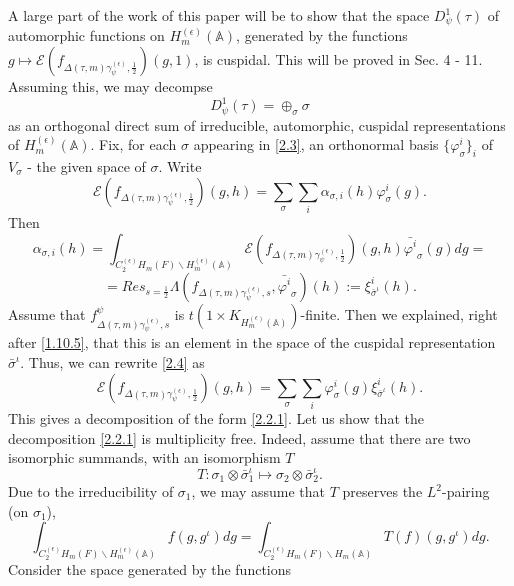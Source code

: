 \documentclass[12pts]{amsart}
\newcommand{\BA}{{\mathbb {A}}}
\begin{document}
A large part of the work of this paper will be to show that the space $D^1_\psi(\tau)$ of automorphic functions on $H^{(\epsilon)}_m(\BA)$, generated by the functions $g\mapsto \mathcal{E}(f_{\Delta(\tau,m)\gamma^{(\epsilon)}_\psi,\frac{1}{2}})(g,1)$, is cuspidal.  This will be proved in Sec. 4 - 11. Assuming this, we may decompse
\begin{equation}\label{2.3}
D^1_\psi(\tau)=\oplus _\sigma\sigma
\end{equation}
as an orthogonal direct sum of irreducible, automorphic, cuspidal representations of $H^{(\epsilon)}_m(\BA)$.
Fix, for each $\sigma$ appearing in \eqref{2.3}, an orthonormal basis $\{\varphi^i_\sigma\}_i$ of $V_\sigma$ - the given space of $\sigma$. Write 
\begin{equation}\label{2.4}
\mathcal{E}(f_{\Delta(\tau,m)\gamma^{(\epsilon)}_\psi,\frac{1}{2}})(g,h)=\sum_\sigma\sum_i\alpha_{\sigma,i}(h)\varphi^i_\sigma(g).
\end{equation}
Then
$$
\alpha_{\sigma,i}(h)=\int_{C_2^{(\epsilon)}H_m(F)\backslash H^{(\epsilon)}_m(\BA)}\mathcal{E}(f_{\Delta(\tau,m)\gamma^{(\epsilon)}_\psi,\frac{1}{2}})(g,h)\bar{\varphi^i}_\sigma(g)dg=
$$
$$
=Res_{s=\frac{1}{2}}\Lambda(f_{\Delta(\tau,m)\gamma^{(\epsilon)}_\psi,s},\bar{\varphi^i}_\sigma)(h):=\xi^i_{\bar{\sigma}^\iota}(h).
$$
Assume that $f^\psi_{\Delta(\tau, m)\gamma^{(\epsilon)}_\psi,s}$ is $t(1\times K_{H_m^{(\epsilon)}(\BA)})$-finite. Then we explained, right after \eqref{1.10.5}, that this is an element in the space of the cuspidal representation $\bar{\sigma}^\iota$. Thus, we can rewrite \eqref{2.4} as
\begin{equation}\label{2.5}
\mathcal{E}(f_{\Delta(\tau,m)\gamma^{(\epsilon)}_\psi,\frac{1}{2}})(g,h)=\sum_\sigma\sum_i
\varphi^i_\sigma(g)\xi^i_{\bar{\sigma}^\iota}(h).
\end{equation}
This gives a decomposition of the form \eqref{2.2.1}. Let us show that the decomposition \eqref{2.2.1} is multiplicity free. Indeed, assume that there are two isomorphic summands, with an isomorphism $T$
\begin{equation}\label{2.6}
T:\sigma_1\otimes \bar{\sigma}_1^\iota \mapsto \sigma_2\otimes \bar{\sigma}_2^\iota.
\end{equation}
Due to the irreducibility of $\sigma_1$, we may assume that $T$ preserves the $L^2$-pairing (on $\sigma_1$),
$$
\int_{C_2^{(\epsilon)}H_m(F)\backslash
	H^{(\epsilon)}_m(\BA)}f(g,g^\iota)dg=\int_{C_2^{(\epsilon)}H_m(F)\backslash
	H_m(\BA)}T(f)(g,g^\iota)dg.
$$
Consider the space generated by the functions 
\end{document}
